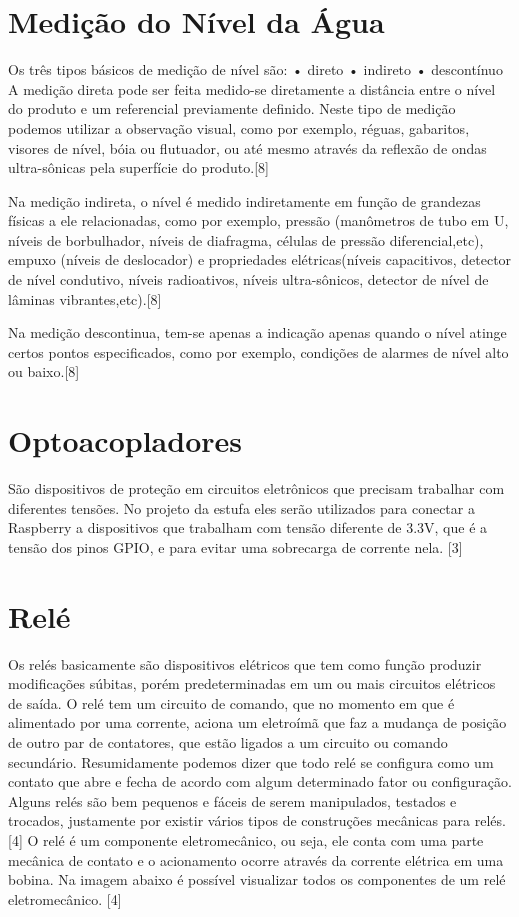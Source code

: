 \section{Medição do Nível da Água}

Os três tipos básicos de medição de nível são:
• direto
• indireto
• descontínuo
A medição direta pode ser feita medido-se diretamente a distância entre o nível do produto e um referencial previamente definido. Neste tipo de medição podemos utilizar a observação visual, como por exemplo, réguas, gabaritos, visores de nível, bóia ou flutuador, ou até mesmo através da reflexão de ondas ultra-sônicas pela superfície do produto.[8]

Na medição indireta, o nível é medido indiretamente em função de grandezas físicas a ele relacionadas, como por exemplo, pressão (manômetros de tubo em U, níveis de borbulhador, níveis de diafragma, células de pressão diferencial,etc), empuxo (níveis de deslocador) e propriedades elétricas(níveis capacitivos, detector de nível condutivo, níveis radioativos, níveis ultra-sônicos, detector de nível de lâminas vibrantes,etc).[8]

Na medição descontinua, tem-se apenas a indicação apenas quando o nível atinge certos pontos especificados, como por exemplo, condições de alarmes de nível alto ou baixo.[8]

\section{Optoacopladores}

São dispositivos de proteção em circuitos eletrônicos que precisam trabalhar com diferentes tensões. No projeto da estufa eles serão utilizados para conectar a Raspberry a dispositivos que trabalham com tensão diferente de 3.3V, que é a tensão dos pinos GPIO, e para evitar uma sobrecarga de corrente nela.  [3]

\section{Relé}

Os relés basicamente são dispositivos elétricos que tem como função produzir modificações súbitas, porém predeterminadas em um ou mais circuitos elétricos de saída. O relé tem um circuito de comando, que no momento em que é alimentado por uma corrente, aciona um eletroímã que faz a mudança de posição de outro par de contatores, que estão ligados a um circuito ou comando secundário. Resumidamente podemos dizer que todo relé se configura como um contato que abre e fecha de acordo com algum determinado fator ou configuração. Alguns relés são bem pequenos e fáceis de serem manipulados, testados e trocados, justamente por existir vários tipos de construções mecânicas para relés. [4]
O relé é um componente eletromecânico, ou seja, ele conta com uma parte mecânica de contato e o acionamento ocorre através da corrente elétrica em uma bobina. Na imagem abaixo é possível visualizar todos os componentes de um relé eletromecânico. [4]

